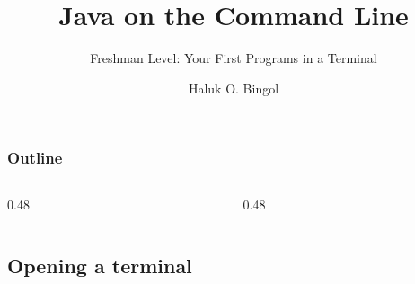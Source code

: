 \documentclass[aspectratio=169,10pt,compress]{beamer}
\title{Java on the Command Line}
\subtitle{Freshman Level: Your First Programs in a Terminal}
\author[Bingol]{Haluk O. Bingol}
\institute[FCIS]{
    Faculty of Computer and Information Sciences\\
    Yeditepe University
}
\date{
	{\tiny \hbTimeStamp}
}
\begin{document}
\begin{frame}[t,fragile]
  \titlepage
\end{frame}




\begin{frame}[t,fragile] \frametitle{Outline}
  \begin{columns}[T]
    \begin{column}{0.48\textwidth}
      \tableofcontents[sections={1-3}, hideallsubsections]
    \end{column}
    \begin{column}{0.48\textwidth}
      \tableofcontents[sections={4-6}, hideallsubsections]
    \end{column}
  \end{columns}
\end{frame}


\subsection[Open]{Opening a terminal}
\end{document}

